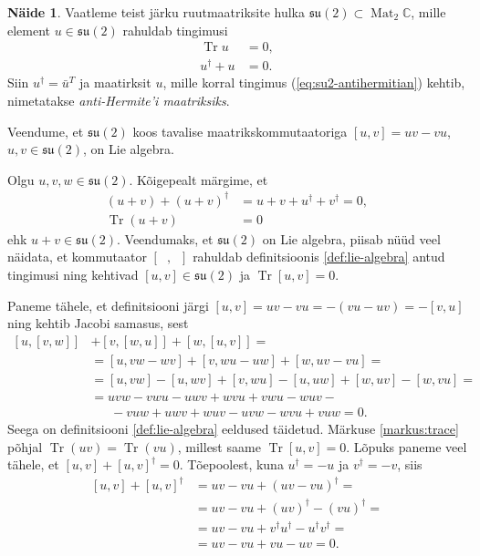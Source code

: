 \documentclass[12pt,a4paper,oneside]{article}
\theoremstyle{plain}
\theoremstyle{definition}
\newtheorem{naide}{Näide}[section]
\numberwithin{equation}{section}
\def\C{{\mathbb C}}
\def\su2{{\mathfrak{ su}\left(2\right)}}
\DeclareMathOperator{\Mat}{Mat}
\DeclareMathOperator{\Tr}{Tr}
\begin{document}
\begin{naide} \label{naide:su2}
Vaatleme teist järku ruutmaatriksite hulka $\su2 \subset \Mat_2 \C$, 
mille element $u \in \su2$ rahuldab tingimusi
\begin{align}
\Tr u &= 0, \label{eq:su2-tr=0}\\ 
u^\dagger + u &= 0. \label{eq:su2-antihermitian}
\end{align}
Siin $u^\dagger = \bar{u}^T$ ja maatirksit $u$, mille korral tingimus 
(\ref{eq:su2-antihermitian}) kehtib, nimetatakse \emph{anti-Hermite'i 
maatriksiks}.
 
Veendume, et $\su2$ koos tavalise maatrikskommutaatoriga 
$\left[u,v\right] = uv - vu$, $u, v \in \su2$, on Lie algebra.

Olgu $u, v, w \in \su2$. Kõigepealt märgime, et 
\begin{align*}
\left(u + v\right) + \left(u + v\right)^\dagger &= 
u + v + u^\dagger + v^\dagger = 0, \\
\Tr \left(u + v\right) &= 0
\end{align*}
ehk $u + v \in \su2$. Veendumaks, et $\su2$ on Lie algebra, piisab 
nüüd veel näidata, et kommutaator $\left[\phantom{u}, 
\phantom{u}\right]$ rahuldab definitsioonis \ref{def:lie-algebra} 
antud tingimusi ning kehtivad $\left[u,v\right] \in \su2$ ja 
$\Tr \left[u,v\right] = 0$. 

Paneme tähele, et definitsiooni järgi $\left[u,v\right] = 
uv - vu = - \left(vu - uv\right) = - \left[v,u\right]$ ning 
kehtib Jacobi samasus, sest
\begin{align*}
\left[u, \left[v, w\right]\right] &+ 
	\left[v, \left[w, u\right]\right] + 
	\left[w, \left[u, v\right]\right] = \\
&= \left[u, vw - wv \right] + 
	\left[v, wu - uw \right] + 
	\left[w, uv - vu \right] = \\
&= \left[u, vw\right] - \left[u, wv\right] + 
	\left[v, wu\right] - \left[u, uw\right] + 
	\left[w, uv\right] - \left[w, vu\right] = \\
&= uvw - vwu - uwv + wvu + vwu - wuv - \\
&\phantom{=}\ - vuw + uwv + wuv - uvw - wvu + vuw = 0.
\end{align*}
Seega on definitsiooni \ref{def:lie-algebra} eeldused täidetud. 
Märkuse \ref{markus:trace} põhjal $\Tr \left(uv\right) = 
\Tr \left(vu\right)$, millest saame $\Tr \left[u,v\right] = 0$. 
Lõpuks paneme veel tähele, et $\left[u,v\right] + 
\left[u,v\right]^\dagger = 0$. Tõepoolest, kuna $u^\dagger = -u$ ja 
$v^\dagger = -v$, siis
\begin{align*}
\left[u,v\right] + \left[u,v\right]^\dagger &= 
uv - vu + \left(uv - vu\right)^\dagger = \\
&= uv - vu + \left(uv\right)^\dagger - \left(vu\right)^\dagger = \\
&= uv - vu + v^\dagger u^\dagger - u^\dagger v^\dagger = \\
&= uv - vu + vu - uv = 0.
\end{align*}
\end{naide}
\end{document}
